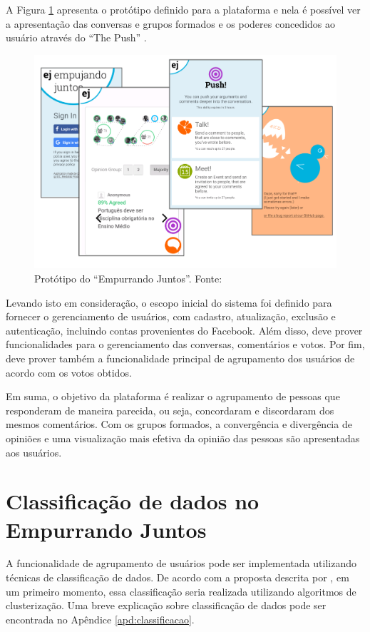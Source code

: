   A Figura \ref{fig:prototipo} apresenta o protótipo definido para a plataforma e nela é possível ver a apresentação das conversas
  e grupos formados e os poderes concedidos ao usuário através do ``The Push'' \cite{parra}.

  \begin{figure}[h!]
  \centering
  \includegraphics[scale=0.3]{figuras/prototipo.png}
  \caption{Protótipo do ``Empurrando Juntos''. Fonte: \cite{parra}}
  \label{fig:prototipo}
  \end{figure}

  Levando isto em consideração, o escopo inicial do sistema foi definido para fornecer o gerenciamento de usuários, com cadastro, atualização, exclusão e autenticação, 
  incluindo contas provenientes do Facebook. Além disso, deve prover funcionalidades para o gerenciamento das conversas, comentários
  e votos. Por fim, deve prover também a funcionalidade principal de agrupamento dos usuários de acordo com os votos obtidos.
  
  Em suma, o objetivo da plataforma é realizar o agrupamento de pessoas que responderam de maneira parecida, ou seja, 
  concordaram e discordaram dos mesmos comentários. Com os grupos formados, a convergência e divergência 
  de opiniões e uma visualização mais efetiva da opinião das pessoas são apresentadas aos usuários.

\section{Classificação de dados no Empurrando Juntos}

  A funcionalidade de agrupamento de usuários pode ser implementada utilizando técnicas de classificação de dados.
  De acordo com a proposta descrita por , 
  em um primeiro momento, essa classificação seria realizada utilizando algoritmos de clusterização.
  Uma breve explicação sobre classificação de dados pode ser encontrada no Apêndice \ref{apd:classificacao}.
  
